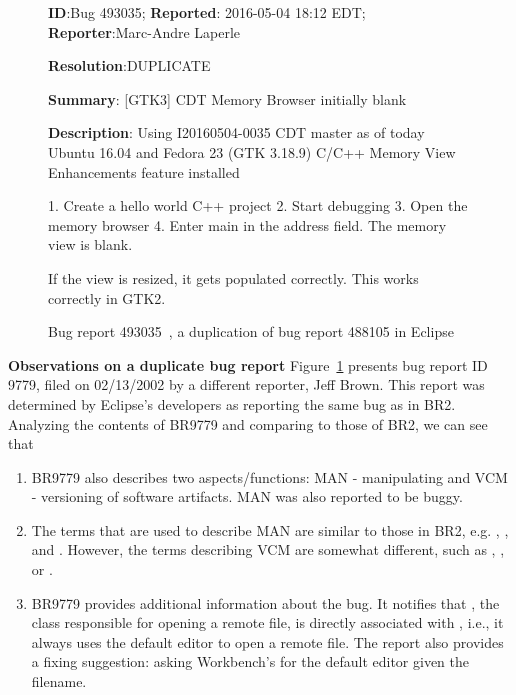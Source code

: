 \begin{figure}
\sf
\small
\textbf{ID}:Bug 493035; \textbf{Reported}: 2016-05-04 18:12 EDT; \textbf{Reporter}:Marc-Andre Laperle

\textbf{Resolution}:DUPLICATE

\textbf{Summary}: [GTK3] CDT Memory Browser initially blank

\textbf{Description}: 
Using I20160504-0035
CDT master as of today
Ubuntu 16.04 and Fedora 23 (GTK 3.18.9)
C/C++ Memory View Enhancements feature installed

1. Create a hello world C++ project
2. Start debugging
3. Open the memory browser
4. Enter main in the address field. The memory view is blank.

If the view is resized, it gets populated correctly. This works correctly in GTK2.
\caption{Bug report 493035~\cite{bug493035}, a duplication of bug report 488105 in Eclipse}
\label{fig:br2}
\end{figure}

\vspace{0.04in}\noindent\textbf{Observations on a duplicate bug
report} Figure~\ref{fig:br2} presents bug report ID 9779, filed on
02/13/2002 by a different reporter, Jeff Brown. This report was
determined by Eclipse's developers as reporting the same bug as in
BR2. Analyzing the contents of BR9779 and comparing to those of BR2,
we can see that


\begin{enumerate}


\item BR9779 also describes two aspects/functions: MAN - manipulating and
VCM - versioning of software artifacts. MAN was also reported to be
buggy.

\item The terms that are used to describe MAN are similar to those in BR2,
e.g. , , and . However, the terms
describing VCM are somewhat different, such as ,
, or .

\item BR9779 provides additional information about the bug. It notifies
that , the class responsible for opening
a remote file, is directly associated with
, i.e., it always uses the
default editor to open a remote file. The report also provides a
fixing suggestion: asking Workbench's  for the
default editor given the filename.

\end{enumerate}

